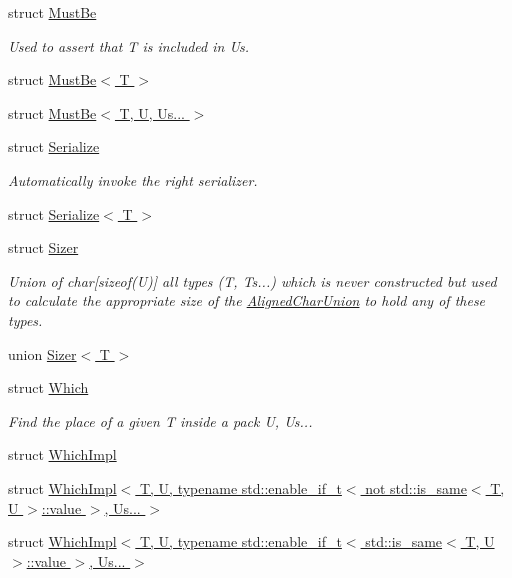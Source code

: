 \begin{DoxyCompactItemize}
\item 
struct \hyperlink{structvt_1_1util_1_1adt_1_1detail_1_1_must_be}{Must\+Be}
\begin{DoxyCompactList}\small\item\em Used to assert that {\ttfamily T} is included in {\ttfamily Us}. \end{DoxyCompactList}\item 
struct \hyperlink{structvt_1_1util_1_1adt_1_1detail_1_1_must_be_3_01_t_01_4}{Must\+Be$<$ T $>$}
\item 
struct \hyperlink{structvt_1_1util_1_1adt_1_1detail_1_1_must_be_3_01_t_00_01_u_00_01_us_8_8_8_01_4}{Must\+Be$<$ T, U, Us... $>$}
\item 
struct \hyperlink{structvt_1_1util_1_1adt_1_1detail_1_1_serialize}{Serialize}
\begin{DoxyCompactList}\small\item\em Automatically invoke the right serializer. \end{DoxyCompactList}\item 
struct \hyperlink{structvt_1_1util_1_1adt_1_1detail_1_1_serialize_3_01_t_01_4}{Serialize$<$ T $>$}
\item 
struct \hyperlink{unionvt_1_1util_1_1adt_1_1detail_1_1_sizer}{Sizer}
\begin{DoxyCompactList}\small\item\em Union of char\mbox{[}sizeof(\+U)\mbox{]} all types (T, Ts...) which is never constructed but used to calculate the appropriate size of the {\ttfamily \hyperlink{structvt_1_1util_1_1adt_1_1_aligned_char_union}{Aligned\+Char\+Union}} to hold any of these types. \end{DoxyCompactList}\item 
union \hyperlink{unionvt_1_1util_1_1adt_1_1detail_1_1_sizer_3_01_t_01_4}{Sizer$<$ T $>$}
\item 
struct \hyperlink{structvt_1_1util_1_1adt_1_1detail_1_1_which}{Which}
\begin{DoxyCompactList}\small\item\em Find the place of a given {\ttfamily T} inside a pack {\ttfamily U}, Us... \end{DoxyCompactList}\item 
struct \hyperlink{structvt_1_1util_1_1adt_1_1detail_1_1_which_impl}{Which\+Impl}
\item 
struct \hyperlink{structvt_1_1util_1_1adt_1_1detail_1_1_which_impl_3_01_t_00_01_u_00_01typename_01std_1_1enable__i4d9447de0f2954cce0452213fa3ad5db}{Which\+Impl$<$ T, U, typename std\+::enable\+\_\+if\+\_\+t$<$ not std\+::is\+\_\+same$<$ T, U $>$\+::value $>$, Us... $>$}
\item 
struct \hyperlink{structvt_1_1util_1_1adt_1_1detail_1_1_which_impl_3_01_t_00_01_u_00_01typename_01std_1_1enable__i0f067a3d2e31ed39b40aceedb711df3e}{Which\+Impl$<$ T, U, typename std\+::enable\+\_\+if\+\_\+t$<$ std\+::is\+\_\+same$<$ T, U $>$\+::value $>$, Us... $>$}
\end{DoxyCompactItemize}
